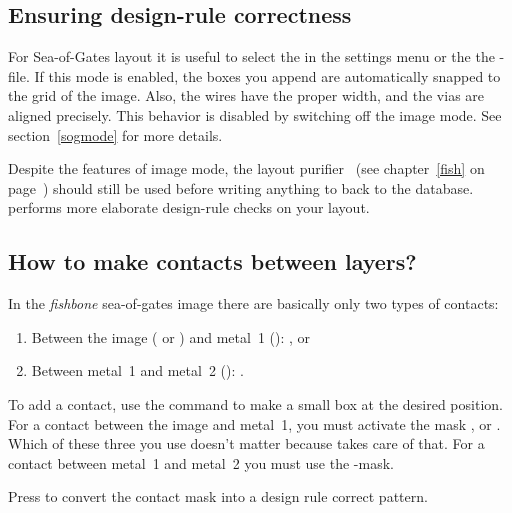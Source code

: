 
\subsection{Ensuring design-rule correctness}
For Sea-of-Gates layout it is useful to select the 
in the settings menu or the the -file. If this mode is
enabled, the boxes you append are automatically snapped to the grid of
the image. Also, the wires have the proper width, and the vias
are aligned precisely. This behavior is disabled by switching off the
image mode. See section~\ref{sogmode} for more details.

Despite the features of image mode, the layout purifier~
(see chapter~\ref{fish} on page~\pageref{fish}) should still be used before
writing anything to back to the database.  performs more
elaborate design-rule checks on your layout.

\subsection{How to make contacts between layers?}
In the {\sl fishbone} sea-of-gates image there are basically only two types of
contacts: 
\begin{enumerate}
\item
Between the image ( or ) and metal~1 ():
,  or 
\item
Between metal~1 and metal~2 (): .
\end{enumerate}
To add a contact, use the  command to make a small box
at the desired position.  For a contact between the image and metal~1,
you must activate the mask ,  or . Which
of these three you use doesn't matter because  takes care of
that.  For a contact between metal~1 and metal~2 you must use the
-mask.

Press  to convert the contact mask into a design rule
correct pattern.


